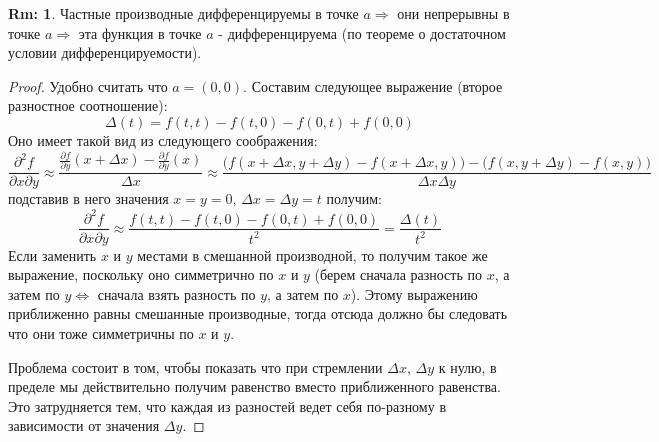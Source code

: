 \documentclass[12pt]{article}
\theoremstyle{definition}
\newtheorem{rem}{Rm:}
\begin{document}
\begin{rem}
	Частные производные дифференцируемы в точке $a \Rightarrow$ они непрерывны в точке $a \Rightarrow$ эта функция в точке $a$ - дифференцируема (по теореме о достаточном условии дифференцируемости).
\end{rem}
\begin{proof}
	Удобно считать что $a = (0,0)$. Составим следующее выражение (второе разностное соотношение): 
	$$
		\Delta(t) = f(t,t) - f(t,0) - f(0,t) + f(0,0)
	$$
	Оно имеет такой вид из следующего соображения:
	$$
		\dfrac{\partial^2 f}{\partial x \partial y} \approx \dfrac{\tfrac{\partial f}{\partial y}(x + \Delta x) - \tfrac{\partial f}{\partial y}(x)}{\Delta x} \approx \dfrac{\big(f(x + \Delta x, y + \Delta y) - f(x + \Delta x, y)\big) - \big(f(x, y + \Delta y) - f(x, y)\big)}{\Delta x \Delta y}
	$$
	подставив в него значения $x = y =0, \, \Delta x = \Delta y = t$ получим:
	$$
		\dfrac{\partial^2 f}{\partial x \partial y} \approx \dfrac{f(t,t) - f(t,0) - f(0,t) + f(0,0)}{t^2} = \dfrac{\Delta(t)}{t^2}
	$$
	Если заменить $x$ и $y$ местами в смешанной производной, то получим такое же выражение, поскольку оно симметрично по $x$ и $y$ (берем сначала разность по $x$, а затем по $y \Leftrightarrow$ сначала взять разность по $y$, а затем по $x$). Этому выражению приближенно равны смешанные производные, тогда отсюда должно бы следовать что они тоже симметричны по $x$ и $y$. 
	
	Проблема состоит в том, чтобы показать что при стремлении $\Delta x, \, \Delta y$ к нулю, в пределе мы действительно получим равенство вместо приближенного равенства. Это затрудняется тем, что каждая из разностей ведет себя по-разному в зависимости от значения $\Delta y$.
	

\end{proof}
\end{document}
